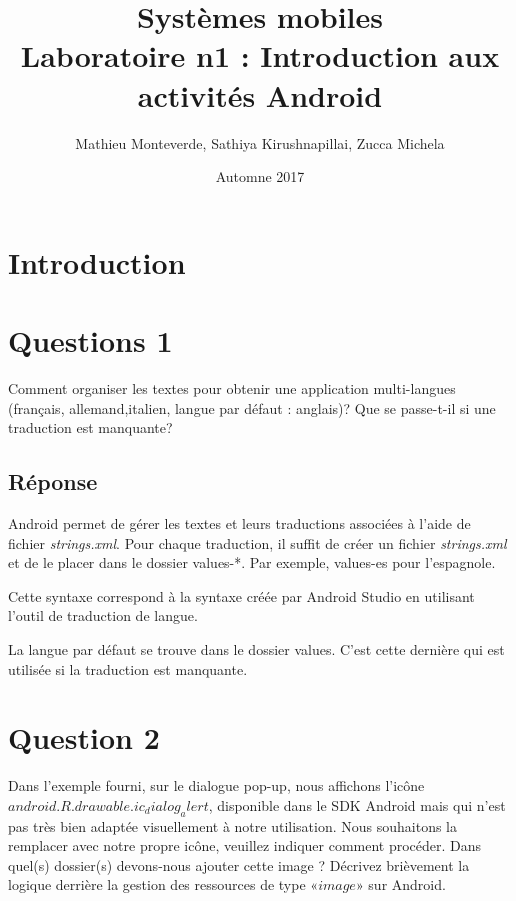 \documentclass[francais,12pt]{article}
\title{Systèmes mobiles \\ Laboratoire n1 : Introduction aux activités Android}
\author{Mathieu Monteverde, Sathiya Kirushnapillai, Zucca Michela}
\date{Automne 2017}
\begin{document}
	\maketitle
    
    \setlength{\parskip}{1em}
	
	\section*{Introduction}	

    \section*{Questions 1}

        Comment organiser les textes pour obtenir une application multi-langues (français, allemand,italien, langue par défaut : anglais)? Que se passe-t-il si une traduction est manquante? \par
        
        \subsection*{Réponse}
        
        Android permet de gérer les textes et leurs traductions associées à l'aide de fichier \textit{strings.xml}. Pour chaque traduction, il suffit de créer un fichier \textit{strings.xml} et de le placer dans le dossier values-*. Par exemple, values-es pour l'espagnole.\par

        Cette syntaxe correspond à la syntaxe créée par Android Studio en utilisant l'outil de traduction de langue. 
        
        La langue par défaut se trouve dans le dossier values. C'est cette dernière qui est utilisée si la traduction est manquante.

	\section*{Question 2}
		Dans l'exemple fourni, sur le dialogue pop-up, nous affichons l'icône $android.R.drawable.ic_dialog_alert$, disponible dans le SDK Android mais qui n’est pas très bien adaptée visuellement à notre utilisation. Nous souhaitons la remplacer avec notre propre icône, veuillez indiquer comment procéder. Dans quel(s) dossier(s) devons-nous ajouter cette image ? Décrivez brièvement la logique derrière la gestion des ressources de type $« image »$ sur Android. 
		
\end{document}
